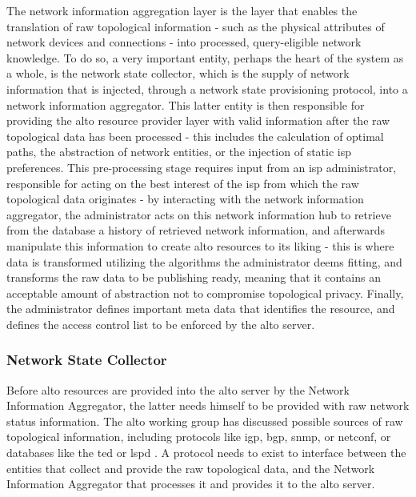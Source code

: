     The network information aggregation layer is the layer that enables the translation of raw topological information - such as the physical attributes of network devices and connections - into processed, query-eligible network knowledge.
    To do so, a very important entity, perhaps the heart of the system as a whole, is the network state collector, which is the supply of network information that is injected, through a network state provisioning protocol, into a network information aggregator.
    This latter entity is then responsible for providing the \gls{alto} resource provider layer with valid information after the raw topological data has been processed - this includes the calculation of optimal paths, the abstraction of network entities, or the injection of static \gls{isp} preferences.
    This pre-processing stage requires input from an \gls{isp} administrator, responsible for acting on the best interest of the \gls{isp} from which the raw topological data originates - by interacting with the network information aggregator, the administrator acts on this network information hub to retrieve from the database a history of retrieved network information, and afterwards manipulate this information to create \gls{alto} resources to its liking - this is where data is transformed utilizing the algorithms the administrator deems fitting, and transforms the raw data to be publishing ready, meaning that it contains an acceptable amount of abstraction not to compromise topological privacy.
    Finally, the administrator defines important meta data that identifies the resource, and defines the access control list to be enforced by the \gls{alto} server.

\subsubsection{Network State Collector}

    Before \gls{alto} resources are provided into the \gls{alto} server by the Network Information Aggregator, the latter needs himself to be provided with raw network status information.
    The \gls{alto} working group has discussed possible sources of raw topological information, including protocols like \gls{igp}, \gls{bgp}, \gls{snmp}, or \gls{netconf}, or databases like the \gls{ted} or \gls{lspd} \cite{alto-deployment-considerations}.
    A protocol needs to exist to interface between the entities that collect and provide the raw topological data, and the Network Information Aggregator that processes it and provides it to the \gls{alto} server.

